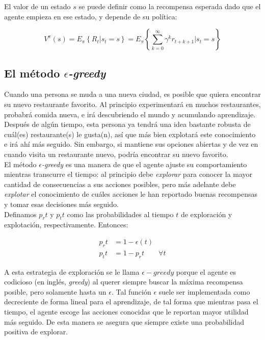 El valor de un estado $s$ se puede definir como la recompensa esperada dado que el agente empieza en ese estado, y depende de su pol\'itica:

$$
V^{\pi}(s) = E_{\pi}\left\{R_{t}|s_{t} = s\right\} = E_{\pi}\left\{\sum_{k=0}^{\infty}\gamma^{k}r_{t+k+1}|s_{t}=s\right\}
$$

\subsection{El m\'etodo $\epsilon$\textit{-greedy}}

Cuando una persona se muda a una nueva ciudad, es posible que quiera encontrar su nuevo restaurante favorito. Al principio experimentar\'a en muchos restaurantes, probabr\'a comida nueva, e ir\'a descubriendo el mundo y acumulando aprendizaje. Despu\'es de alg\'un tiempo, esta persona ya tendr\'a una idea bastante robusta de cu\'al(es) restaurante(s) le gusta(n), as\'i que m\'as bien explotar\'a este conocimiento e ir\'a ah\'i m\'as seguido. Sin embargo, si mantiene sus opciones abiertas y de vez en cuando visita un restaurante nuevo, podr\'ia encontrar su nuevo favorito.\\

El m\'etodo $\epsilon$\textit{-greedy} es una manera de  que el agente ajuste su comportamiento mientras transcurre el tiempo: al principio debe \textit{explorar} para conocer la mayor cantidad de consecuencias a sus acciones posibles, pero m\'as adelante debe \textit{explotar} el conocimiento de cu\'ales acciones le han reportado buenas recompensas y tomar esas decisiones m\'as seguido. \\

Definamos $p_r{t}$ y $p_t{t}$ como las probabilidades al tiempo $t$ de exploraci\'on y explotaci\'on, respectivamente. Entonces:

\vspace{-30pt}
\begin{align*}
p_r{t} &= 1 - \epsilon(t) \\
p_t{t} &= 1 - p_r{t} \quad \quad \forall t
\end{align*}

A esta estrategia de exploraci\'on se le llama $\epsilon-greedy$ porque el agente es codicioso (en ingl\'es, \textit{greedy}) al querer siempre buscar la m\'axima recompensa posible, pero solamente hasta un $\epsilon$. Tal funci\'on $\epsilon$ suele ser implementada como decreciente de forma lineal para el aprendizaje, de tal forma que mientras pasa el tiempo, el agente escoge las acciones conocidas que le reportan mayor utilidad m\'as seguido. De esta manera se asegura que siempre existe una probabilidad positiva de explorar.\\

